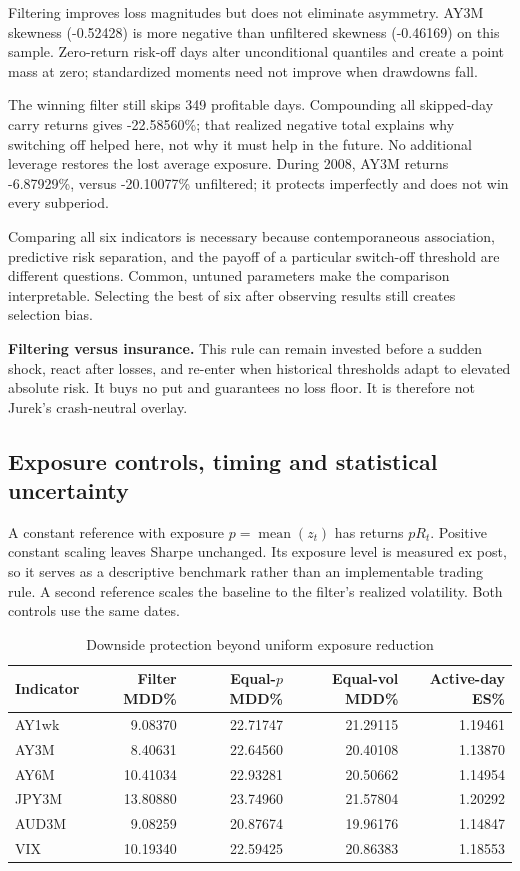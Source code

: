 \documentclass[10pt,letterpaper]{article}
\newcommand{\rCondBaseSkew}{-0.46169}
\newcommand{\rCondSkew}{-0.52428}
\newcommand{\rOffProfits}{349}
\newcommand{\rOffCompound}{-22.58560}
\newcommand{\rCrisisBase}{-20.10077}
\newcommand{\rCrisisAY}{-6.87929}
\begin{document}
Filtering improves loss magnitudes but does not eliminate asymmetry. AY3M skewness
(\rCondSkew{}) is more negative than unfiltered skewness (\rCondBaseSkew{}) on this sample.
Zero-return risk-off days alter unconditional quantiles and create a point mass at zero;
standardized moments need not improve when drawdowns fall.

The winning filter still skips \rOffProfits{} profitable days. Compounding all skipped-day
carry returns gives \rOffCompound{}\%; that realized negative total explains why switching off
helped here, not why it must help in the future. No additional leverage restores the lost
average exposure. During 2008, AY3M returns \rCrisisAY{}\%, versus \rCrisisBase{}\% unfiltered;
it protects imperfectly and does not win every subperiod.

Comparing all six indicators is necessary because contemporaneous association, predictive risk
separation, and the payoff of a particular switch-off threshold are different questions.
Common, untuned parameters make the comparison interpretable. Selecting the best of six after
observing results still creates selection bias.

\textbf{Filtering versus insurance.} This rule can remain invested before a sudden shock,
react after losses, and re-enter when historical thresholds adapt to elevated absolute risk.
It buys no put and guarantees no loss floor. It is therefore not Jurek's crash-neutral overlay.
\newpage
\subsection{Exposure controls, timing and statistical uncertainty}
A constant reference with exposure $p=\operatorname{mean}(z_t)$ has returns $pR_t$.
Positive constant scaling leaves Sharpe unchanged. Its exposure level is measured ex post,
so it serves as a descriptive benchmark rather than an implementable trading rule. A second reference
scales the baseline to the filter's realized volatility. Both controls use the same dates.
\begin{table}[H]\centering\small\caption{Downside protection beyond uniform exposure reduction}
\begin{tabular}{lrrrr}\toprule
Indicator & Filter MDD\% & Equal-$p$ MDD\% & Equal-vol MDD\% & Active-day ES\%\\\midrule
AY1wk & 9.08370 & 22.71747 & 21.29115 & 1.19461\\
AY3M & 8.40631 & 22.64560 & 20.40108 & 1.13870\\
AY6M & 10.41034 & 22.93281 & 20.50662 & 1.14954\\
JPY3M & 13.80880 & 23.74960 & 21.57804 & 1.20292\\
AUD3M & 9.08259 & 20.87674 & 19.96176 & 1.14847\\
VIX & 10.19340 & 22.59425 & 20.86383 & 1.18553\\
\bottomrule\end{tabular}\end{table}
\end{document}
